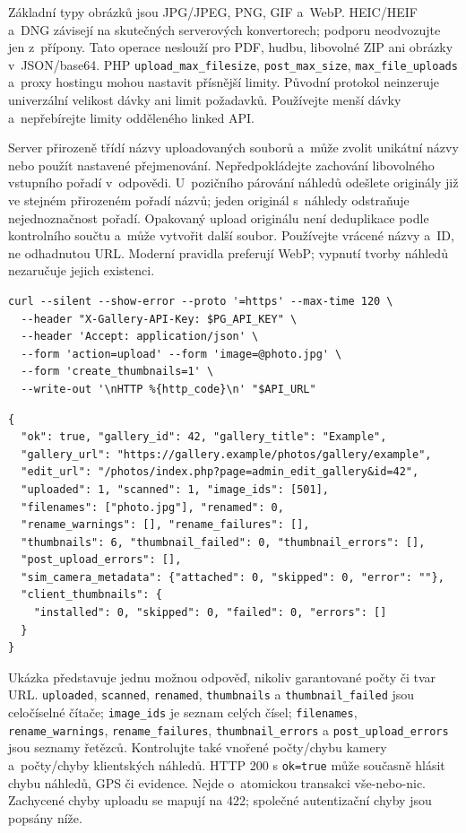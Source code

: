 \documentclass[11pt,a4paper]{article}
\newcommand{\codeword}[1]{\nolinkurl{#1}}
\begin{document}
Základní typy obrázků jsou JPG/JPEG, PNG, GIF a~WebP. HEIC/HEIF a~DNG závisejí na skutečných
serverových konvertorech; podporu neodvozujte jen z~přípony. Tato operace neslouží pro PDF,
hudbu, libovolné ZIP ani obrázky v~JSON/base64. PHP \codeword{upload_max_filesize},
\codeword{post_max_size}, \codeword{max_file_uploads} a~proxy hostingu mohou nastavit
přísnější limity. Původní protokol neinzeruje univerzální velikost dávky ani limit
požadavků. Používejte menší dávky a~nepřebírejte limity odděleného linked API.

Server přirozeně třídí názvy uploadovaných souborů a~může zvolit unikátní názvy nebo použít
nastavené přejmenování. Nepředpokládejte zachování libovolného vstupního pořadí v~odpovědi.
U~pozičního párování náhledů odešlete originály již ve stejném přirozeném pořadí názvů;
jeden originál s~náhledy odstraňuje nejednoznačnost pořadí. Opakovaný upload originálu není
deduplikace podle kontrolního součtu a~může vytvořit další soubor. Používejte vrácené názvy
a~ID, ne odhadnutou URL. Moderní pravidla preferují WebP; vypnutí tvorby náhledů nezaručuje
jejich existenci.

\begin{lstlisting}[language={}]
curl --silent --show-error --proto '=https' --max-time 120 \
  --header "X-Gallery-API-Key: $PG_API_KEY" \
  --header 'Accept: application/json' \
  --form 'action=upload' --form 'image=@photo.jpg' \
  --form 'create_thumbnails=1' \
  --write-out '\nHTTP %{http_code}\n' "$API_URL"
\end{lstlisting}

\begin{lstlisting}[language={}]
{
  "ok": true, "gallery_id": 42, "gallery_title": "Example",
  "gallery_url": "https://gallery.example/photos/gallery/example",
  "edit_url": "/photos/index.php?page=admin_edit_gallery&id=42",
  "uploaded": 1, "scanned": 1, "image_ids": [501],
  "filenames": ["photo.jpg"], "renamed": 0,
  "rename_warnings": [], "rename_failures": [],
  "thumbnails": 6, "thumbnail_failed": 0, "thumbnail_errors": [],
  "post_upload_errors": [],
  "sim_camera_metadata": {"attached": 0, "skipped": 0, "error": ""},
  "client_thumbnails": {
    "installed": 0, "skipped": 0, "failed": 0, "errors": []
  }
}
\end{lstlisting}

Ukázka představuje jednu možnou odpověď, nikoliv garantované počty či tvar URL.
\codeword{uploaded}, \codeword{scanned}, \codeword{renamed}, \codeword{thumbnails} a
\codeword{thumbnail_failed} jsou celočíselné čítače; \codeword{image_ids} je seznam celých
čísel; \codeword{filenames}, \codeword{rename_warnings}, \codeword{rename_failures},
\codeword{thumbnail_errors} a \codeword{post_upload_errors} jsou seznamy řetězců.
Kontrolujte také vnořené počty/chybu kamery a~počty/chyby klientských náhledů. HTTP 200 s
\codeword{ok=true} může současně hlásit chybu náhledů, GPS či evidence. Nejde o~atomickou
transakci vše-nebo-nic. Zachycené chyby uploadu se mapují na 422; společné autentizační
chyby jsou popsány níže.
\end{document}
